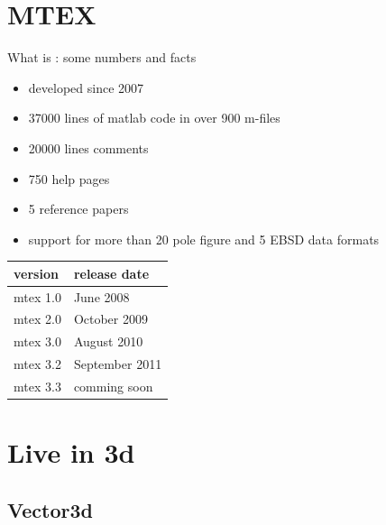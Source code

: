 
\section{MTEX}


\begin{frame}{What is \MTEX: some numbers and facts}


\begin{block}{}

\begin{itemize}
\item developed since 2007
\item 37000 lines of matlab code in over 900 m-files
\item 20000 lines comments
\item 750 help pages
\item 5 reference papers
\item support for more than 20 pole figure and 5 EBSD data formats
\end{itemize}
\end{block}

\begin{block}{}
  \vspace*{0.25em}
  \hspace{1.25em}
  \begin{tabular}{ll}
    version & release date \\
    \toprule
    mtex 1.0 & June 2008 \\
    mtex 2.0 & October 2009 \\
    mtex 3.0 & August 2010 \\
    mtex 3.2 & September 2011\\
    mtex 3.3 & comming soon
  \end{tabular}
\end{block}


\end{frame}


\section{Live in 3d}

\subsection*{Vector3d}

